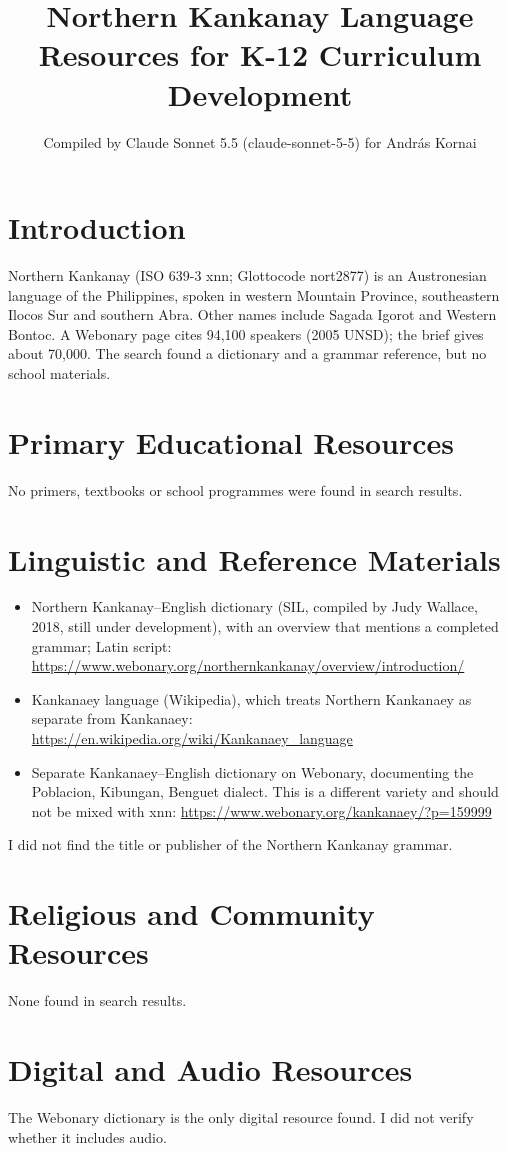 \documentclass[12pt]{article}
\title{Northern Kankanay Language Resources for K-12 Curriculum Development}
\author{Compiled by Claude Sonnet 5.5 (claude-sonnet-5-5) for Andr\'as Kornai}
\date{}
\begin{document}
\maketitle

\section{Introduction}
Northern Kankanay (ISO 639-3 xnn; Glottocode nort2877) is an Austronesian language of the Philippines, spoken in western Mountain Province, southeastern Ilocos Sur and southern Abra. Other names include Sagada Igorot and Western Bontoc. A Webonary page cites 94,100 speakers (2005 UNSD); the brief gives about 70,000. The search found a dictionary and a grammar reference, but no school materials.

\section{Primary Educational Resources}
No primers, textbooks or school programmes were found in search results.

\section{Linguistic and Reference Materials}
\begin{itemize}
\item Northern Kankanay--English dictionary (SIL, compiled by Judy Wallace, 2018, still under development), with an overview that mentions a completed grammar; Latin script: \url{https://www.webonary.org/northernkankanay/overview/introduction/}
\item Kankanaey language (Wikipedia), which treats Northern Kankanaey as separate from Kankanaey: \url{https://en.wikipedia.org/wiki/Kankanaey_language}
\item Separate Kankanaey--English dictionary on Webonary, documenting the Poblacion, Kibungan, Benguet dialect. This is a different variety and should not be mixed with xnn: \url{https://www.webonary.org/kankanaey/?p=159999}
\end{itemize}
I did not find the title or publisher of the Northern Kankanay grammar.

\section{Religious and Community Resources}
None found in search results.

\section{Digital and Audio Resources}
The Webonary dictionary is the only digital resource found. I did not verify whether it includes audio.
\end{document}
